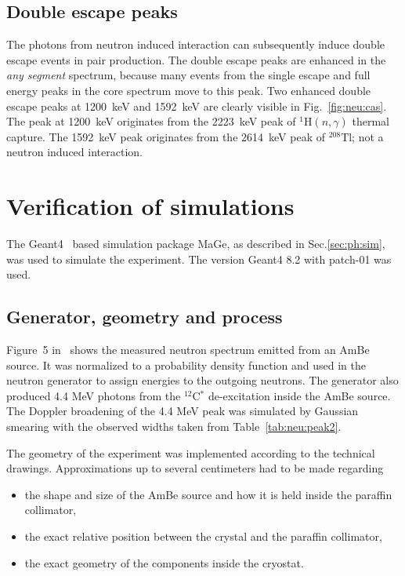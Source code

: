 \subsection{Double escape peaks}
\label{sec:neu:dep}
The photons from neutron induced interaction can subsequently induce double escape events in pair production. The double escape peaks are enhanced in the \emph{any segment} spectrum, because many events from the single escape and full energy peaks in the core spectrum move to this peak. Two enhanced double escape peaks at 1200~keV and 1592~keV are clearly visible in Fig.~\ref{fig:neu:cas}. The peak at 1200~keV originates from the 2223~keV peak of $^{1}$H$(n,\gamma)$ thermal capture. The 1592~keV peak originates from the 2614~keV peak of $^{208}$Tl; not a neutron induced interaction.


\section{Verification of simulations}
\label{sec:neu:sim}
The Geant4~\cite{Gea03,Gea06} based simulation package MaGe, as described in Sec.\ref{sec:ph:sim}, was used to simulate the experiment. The version Geant4 8.2 with patch-01 was used.

\subsection{Generator, geometry and process}
\label{sec:simdetail}
Figure~5 in~\cite{Mar95} shows the measured neutron spectrum emitted
from an AmBe source. It was normalized to a probability density
function and used in the neutron generator to assign energies to the
outgoing neutrons. The generator also produced 4.4 MeV photons from
the $^{12}$C$^{*}$ de-excitation inside the AmBe source. The Doppler
broadening of the 4.4 MeV peak was simulated by Gaussian smearing with
the observed widths taken from Table~\ref{tab:neu:peak2}.

The geometry of the experiment was implemented according to the technical drawings. Approximations up to several centimeters had to be made regarding
\begin{itemize}
\item the shape and size of the AmBe source and how it is held inside
  the paraffin collimator,
\item the exact relative position between the crystal and the paraffin
  collimator,
\item the exact geometry of the components inside the cryostat.
\end{itemize}

